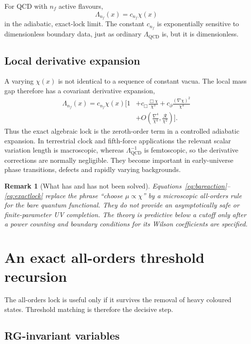 \documentclass[11pt,a4paper]{article}
\newtheorem{remark}[definition]{Remark}
\newcommand{\QCD}{\mathrm{QCD}}
\begin{document}
For QCD with $n_f$ active flavours,
\[
\boxed{
\Lambda_{n_f}(x)=c_{n_f}\chi(x)
}
\label{eq:exactlock}
\]
in the adiabatic, exact-lock limit. The constant $c_{n_f}$ is exponentially sensitive to dimensionless boundary data, just as ordinary $\Lambda_{\QCD}$ is, but it is dimensionless.

\subsection{Local derivative expansion}

A varying $\chi(x)$ is not identical to a sequence of constant vacua. The local mass gap therefore has a covariant derivative expansion,
\begin{align}
\Lambda_{n_f}(x)=c_{n_f}\chi(x)\Bigg[1
&+c_{\Box}\frac{\Box\chi}{\chi^3}
+c_{\partial}\frac{(\nabla\chi)^2}{\chi^4}
\nonumber\\
&+O\!\left(\frac{\nabla^4}{\chi^4},
\frac{\mathcal R}{\chi^2}\right)\Bigg].
\label{eq:derivative}
\end{align}
Thus the exact algebraic lock is the zeroth-order term in a controlled adiabatic expansion. In terrestrial clock and fifth-force applications the relevant scalar variation length is macroscopic, whereas $\Lambda_{\QCD}^{-1}$ is femtoscopic, so the derivative corrections are normally negligible. They become important in early-universe phase transitions, defects and rapidly varying backgrounds.

\begin{remark}[What has and has not been solved]
Equations~\eqref{eq:bareaction}--\eqref{eq:exactlock} replace the phrase ``choose $\mu\propto\chi$'' by a microscopic all-orders rule for the bare quantum functional. They do not provide an asymptotically safe or finite-parameter UV completion. The theory is predictive below a cutoff only after a power counting and boundary conditions for its Wilson coefficients are specified.
\end{remark}

\section{An exact all-orders threshold recursion}
\label{sec:threshold}

The all-orders lock is useful only if it survives the removal of heavy coloured states. Threshold matching is therefore the decisive step.

\subsection{RG-invariant variables}
\end{document}
